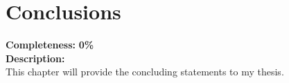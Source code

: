 \chapter{Conclusions}

\textbf{Completeness:} \textbf{0\%} \\


\textbf{Description:} \\
This chapter will provide the concluding statements to my thesis.

